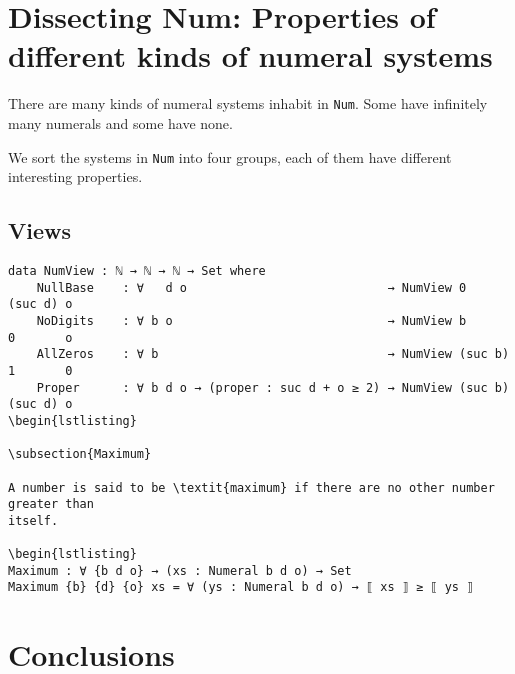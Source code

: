 \documentclass[../thesis.tex]{subfiles}
\begin{document}
\section{Dissecting Num: Properties of different kinds of numeral systems}\label{views}

There are many kinds of numeral systems inhabit in {\lstinline|Num|}.
Some have infinitely many numerals and some have none.

We sort the systems in {\lstinline|Num|} into four groups, each of them have
different interesting properties.

\subsection{Views}


\begin{lstlisting}
data NumView : ℕ → ℕ → ℕ → Set where
    NullBase    : ∀   d o                            → NumView 0       (suc d) o
    NoDigits    : ∀ b o                              → NumView b       0       o
    AllZeros    : ∀ b                                → NumView (suc b) 1       0
    Proper      : ∀ b d o → (proper : suc d + o ≥ 2) → NumView (suc b) (suc d) o
\begin{lstlisting}

\subsection{Maximum}

A number is said to be \textit{maximum} if there are no other number greater than
itself.

\begin{lstlisting}
Maximum : ∀ {b d o} → (xs : Numeral b d o) → Set
Maximum {b} {d} {o} xs = ∀ (ys : Numeral b d o) → ⟦ xs ⟧ ≥ ⟦ ys ⟧
\end{lstlisting}


\section{Conclusions}\label{conclusions}
\end{document}
